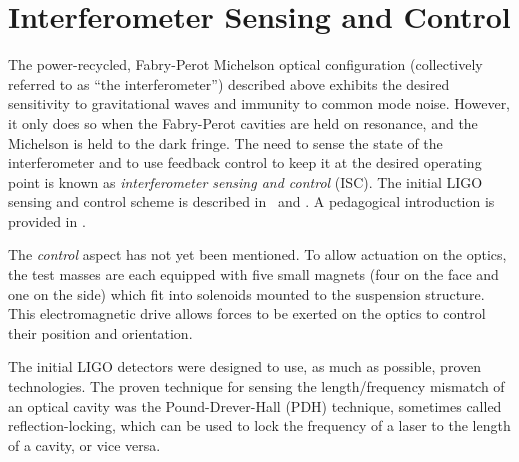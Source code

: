 
\section{Interferometer Sensing and Control}
\label{sec:isc}

The power-recycled, Fabry-Perot Michelson optical configuration
(collectively referred to as ``the interferometer'') described above
exhibits the desired sensitivity to gravitational waves and immunity
to common mode noise.  However, it only does so when the Fabry-Perot
cavities are held on resonance, and the Michelson is held to the dark
fringe.  The need to sense the state of the interferometer and to use
feedback control to keep it at the desired operating point is known as
\emph{interferometer sensing and control} (ISC).  The initial LIGO
sensing and control scheme is described in~\cite{Fritschel2001Readout}
and \cite{Regehr1994Signal}.  A pedagogical introduction is provided
in \cite{Black2003Introduction}.

The \emph{control} aspect has not yet been mentioned.  To allow
actuation on the optics, the test masses are each equipped with five
small magnets (four on the face and one on the side) which fit into
solenoids mounted to the suspension structure.  This electromagnetic
drive allows forces to be exerted on the optics to control their
position and orientation.
 
The initial LIGO detectors were designed to use, as much as possible,
proven technologies.  The proven technique for sensing the
length/frequency mismatch of an optical cavity was the
Pound-Drever-Hall (PDH)
technique\cite{Drever1983Laser,Black2001Introduction}, sometimes
called reflection-locking, which can be used to lock the frequency of
a laser to the length of a cavity, or vice versa.

